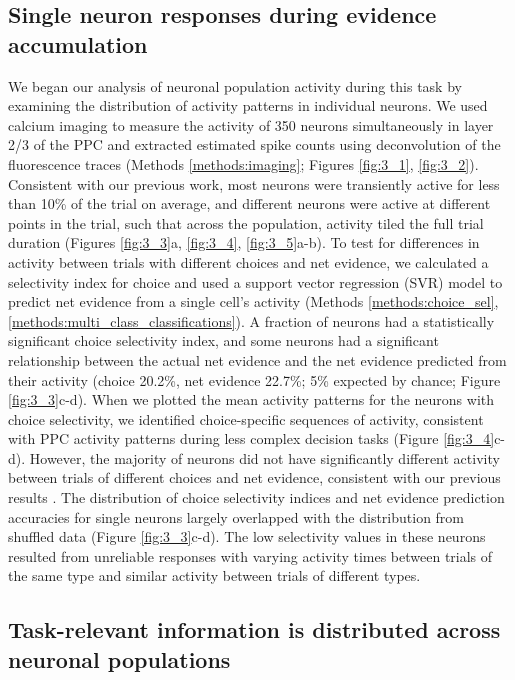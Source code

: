 \subsection{Single neuron responses during evidence accumulation} \label{sec:chap3_single_neuron}

We began our analysis of neuronal population activity during this task by examining the distribution of activity patterns in individual neurons. We used calcium imaging to measure the activity of 350 neurons simultaneously in layer 2/3 of the PPC and extracted estimated spike counts using deconvolution of the fluorescence traces \citep{Vogelstein:2010jl} (Methods \ref{methods:imaging}; Figures \ref{fig:3_1}, \ref{fig:3_2}). Consistent with our previous work, most neurons were transiently active for less than 10\% of the trial on average, and different neurons were active at different points in the trial, such that across the population, activity tiled the full trial duration \citep{Harvey:2012du} (Figures \ref{fig:3_3}a, \ref{fig:3_4}, \ref{fig:3_5}a-b). To test for differences in activity between trials with different choices and net evidence, we calculated a selectivity index for choice and used a support vector regression (SVR) model to predict net evidence from a single cell’s activity (Methods \ref{methods:choice_sel}, \ref{methods:multi_class_classifications}). A fraction of neurons had a statistically significant choice selectivity index, and some neurons had a significant relationship between the actual net evidence and the net evidence predicted from their activity (choice 20.2\%, net evidence 22.7\%; 5\% expected by chance; Figure \ref{fig:3_3}c-d). When we plotted the mean activity patterns for the neurons with choice selectivity, we identified choice-specific sequences of activity, consistent with PPC activity patterns during less complex decision tasks \citep{Harvey:2012du} (Figure \ref{fig:3_4}c-d). However, the majority of neurons did not have significantly different activity between trials of different choices and net evidence, consistent with our previous results \citep{Harvey:2012du}. The distribution of choice selectivity indices and net evidence prediction accuracies for single neurons largely overlapped with the distribution from shuffled data (Figure \ref{fig:3_3}c-d). The low selectivity values in these neurons resulted from unreliable responses with varying activity times between trials of the same type and similar activity between trials of different types. 

\subsection{Task-relevant information is distributed across neuronal populations} \label{sec:chap3_distributed}

